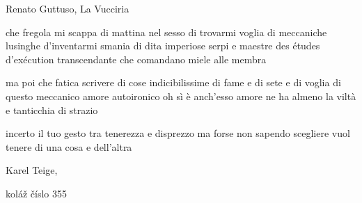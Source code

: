 \clearpage


\begin{artItem}
	Renato Guttuso, La Vucciria
\end{artItem}

\begin{poem}
	\begin{stanza}
		che fregola mi scappa di mattina nel sesso\verseline
		di trovarmi voglia di meccaniche lusinghe\verseline
		d'inventarmi smania di dita\verseline
		imperiose serpi e maestre\verseline
		des études d'exécution transcendante\verseline
		che comandano miele alle membra
	\end{stanza}

	\begin{stanza}
		ma poi che fatica scrivere di cose\verseline
		indicibilissime\verseline
		di fame e di sete e di voglia\verseline
		di questo meccanico amore\verseline
		autoironico\verseline
		oh sì è anch'esso amore\verseline
		ne ha almeno la viltà\verseline
		e tanticchia di strazio
	\end{stanza}
\end{poem}

\clearpage


\begin{poem}
	\begin{stanza}
		incerto il tuo gesto\verseline
		tra tenerezza e disprezzo\verseline
		ma forse\verseline
		non sapendo scegliere\verseline
		vuol tenere di una cosa\verseline
		e dell'altra
	\end{stanza}
\end{poem}

\clearpage


\begin{artItem}
	Karel Teige, \begin{otherlanguage}{czech}%
		koláž číslo 355%
	\end{otherlanguage}
\end{artItem}

